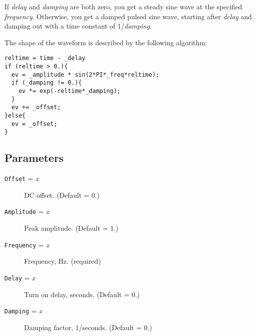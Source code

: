 If {\em delay} and {\em damping} are both zero, you get a steady sine
wave at the specified {\em frequency}.  Otherwise, you get a damped
pulsed sine wave, starting after {\em delay} and damping out with a
time constant of 1/{\em damping}.

The shape of the waveform is described by the following algorithm:

\begin{verbatim}
reltime = time - _delay
if (reltime > 0.){
  ev = _amplitude * sin(2*PI*_freq*reltime);
  if (_damping != 0.){
    ev *= exp(-reltime*_damping);
  }
  ev += _offset;
}else{
  ev = _offset;
}
\end{verbatim}
\subsection{Parameters}

\begin{description}

\item[{\tt Offset} = {\it x}] DC offset.  (Default = 0.)

\item[{\tt Amplitude} = {\it x}] Peak amplitude.  (Default = 1.)

\item[{\tt Frequency} = {\it x}] Frequency, Hz.  (required)

\item[{\tt Delay} = {\it x}] Turn on delay, seconds.  (Default = 0.)

\item[{\tt Damping} = {\it x}] Damping factor, 1/seconds.  (Default = 0.)

\end{description}
